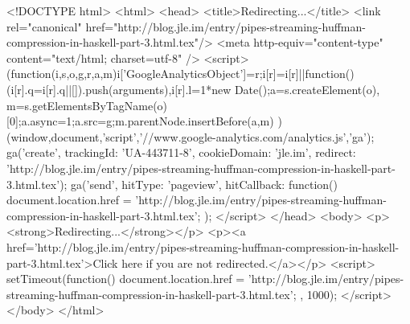 <!DOCTYPE html>
<html>
<head>
<title>Redirecting...</title>
<link rel="canonical" href="http://blog.jle.im/entry/pipes-streaming-huffman-compression-in-haskell-part-3.html.tex"/>
<meta http-equiv="content-type" content="text/html; charset=utf-8" />
<script>
(function(i,s,o,g,r,a,m){i['GoogleAnalyticsObject']=r;i[r]=i[r]||function(){
(i[r].q=i[r].q||[]).push(arguments)},i[r].l=1*new Date();a=s.createElement(o),
m=s.getElementsByTagName(o)[0];a.async=1;a.src=g;m.parentNode.insertBefore(a,m)
})(window,document,'script','//www.google-analytics.com/analytics.js','ga');
ga('create', { trackingId: 'UA-443711-8', cookieDomain: 'jle.im', redirect: 'http://blog.jle.im/entry/pipes-streaming-huffman-compression-in-haskell-part-3.html.tex'});
ga('send', { hitType: 'pageview', hitCallback: function() { document.location.href = 'http://blog.jle.im/entry/pipes-streaming-huffman-compression-in-haskell-part-3.html.tex'; } });
</script>
</head>
<body>
  <p><strong>Redirecting...</strong></p>
  <p><a href='http://blog.jle.im/entry/pipes-streaming-huffman-compression-in-haskell-part-3.html.tex'>Click here if you are not redirected.</a></p>
  <script>
    setTimeout(function() { document.location.href = 'http://blog.jle.im/entry/pipes-streaming-huffman-compression-in-haskell-part-3.html.tex'; }, 1000);
  </script>
</body>
</html>
